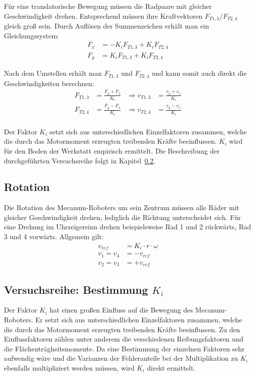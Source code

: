 Für eine translatorische Bewegung müssen die Radpaare mit gleicher Geschwindigkeit drehen.
Entsprechend müssen ihre Kraftvektoren $F_{T1, 3} / F_{T2, 4}$ gleich groß sein.
Durch Auflösen der Summenzeichen erhält man ein Gleichungssystem:
\begin{align*}
    F_x &= - K_i F_{T1, 3} + K_i F_{T2, 4} \\
    F_y &= K_i F_{T1, 3}   + K_i F_{T2, 4}
\end{align*}

Nach dem Umstellen erhält man $F_{T1, 3}$ und $F_{T2, 4}$ und kann somit auch direkt die Geschwindigkeiten berechnen:
\begin{align*}
    F_{T1, 3} &= \frac{F_y + F_x}{K_i} &\Rightarrow v_{T1, 3} &= \frac{v_y + v_x}{K_i} \\
    F_{T2, 4} &= \frac{F_y - F_x}{K_i} &\Rightarrow v_{T2, 4} &= \frac{v_y - v_x}{K_i} \\
\end{align*}

Der Faktor $K_i$ setzt sich aus unterschiedlichen Einzelfaktoren zusammen, welche die durch das Motormoment erzeugten treibenden Kräfte beeinflussen. $K_i$ wird für den Boden der Werkstatt empirisch ermittelt. Die Beschreibung der durchgeführten Versuchsreihe folgt in Kapitel~\ref{sec:versuche-k-faktor}.


\subsection{Rotation}
\label{sec:Rotation}
Die Rotation des Mecanum-Roboters um sein Zentrum müssen alle Räder mit gleicher Geschwindigkeit drehen, lediglich die Richtung unterscheidet sich.
Für eine Drehung im Uhrzeigersinn drehen beispielsweise Rad 1 und 2 rückwärts, Rad 3 und 4 vorwärts. Allgemein gilt:
\begin{align*}
    v_{ref} &= K_i \cdot r \cdot \omega \\
    v_1 = v_4 &= - v_{ref} \\
    v_2 = v_3 &= + v_{ref}
\end{align*}

\subsection{Versuchsreihe: Bestimmung $K_i$}
\label{sec:versuche-k-faktor}

Der Faktor $K_i$ hat einen großen Einfluss auf die Bewegung des Mecanum-Roboters. Er setzt sich aus unterschiedlichen Einzelfaktoren zusammen, welche die durch das Motormoment erzeugten treibenden Kräfte beeinflussen. Zu den Einflussfaktoren zählen unter anderem die verschiedenen Reibungsfaktoren und die Flächenträgheitsmomente. Da eine Bestimmung der einzelnen Faktoren sehr aufwendig wäre und die Varianzen der Fehleranteile  bei der Multiplikation zu $K_i$ ebenfalls multipliziert werden müssen, wird $K_i$ direkt ermittelt. 

